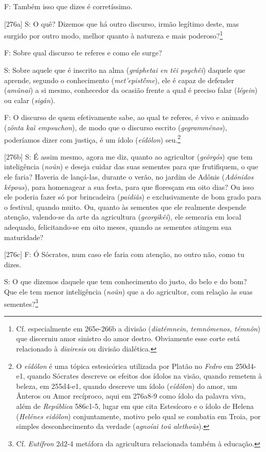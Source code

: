 F: Também isso que dizes é corretíssimo.

{[}276a{]} S: O quê? Dizemos que há outro discurso, irmão legítimo
deste, mas surgido por outro modo, melhor quanto à natureza e mais
poderoso?\footnote{Cf. especialmente em 265e-266b a divisão
  (\emph{diatémnein, temnómenos, témnôn}) que discerniu amor sinistro do
  amor destro. Obviamente esse corte está relacionado à \emph{diairesis}
  ou divisão dialética.}

F: Sobre qual discurso te referes e como ele surge?

S: Sobre aquele que é inscrito na alma (\emph{gráphetai en têi psychêi})
daquele que aprende, segundo o conhecimento (\emph{met'epistḗme}), ele é
capaz de defender (\emph{amûnai}) a si mesmo, conhecedor da ocasião
frente a qual é preciso falar (\emph{légein}) ou calar (\emph{sigân}).

F: O discurso de quem efetivamente sabe, ao qual te referes, é vivo e
animado (\emph{zônta kaì empsuchon}), de modo que o discurso escrito
(\emph{gegramménos}), poderíamos dizer com justiça, é um ídolo
(\emph{eídôlon}) seu.\footnote{O \emph{eídôlon} é uma tópica
  estesicórica utilizada por Platão no \emph{Fedro} em 250d4-e1, quando
  Sócrates descreve os efeitos dos ídolos na visão, quando remetem à
  beleza, em 255d4-e1, quando descreve um ídolo (\emph{eídôlon}) do
  amor, um Ânteros ou Amor recíproco, aqui em 276a8-9 como ídolo da
  palavra viva, além de \emph{República} 586c1-5, lugar em que cita
  Estesícoro e o ídolo de Helena (\emph{Helénes eidôlon}) conjuntamente,
  motivo pelo qual se combatia em Troia, por simples desconhecimento da
  verdade (\emph{agnoíai toû alethoûs}).}

{[}276b{]} S: É assim mesmo, agora me diz, quanto ao agricultor
(\emph{geôrgós}) que tem inteligência (\emph{noûn}) e deseja cuidar das
suas sementes para que frutifiquem, o que ele faria? Haveria de
lançá-las, durante o verão, no jardim de Adônis (\emph{Adónidos
kêpous}), para homenagear a sua festa, para que floresçam em oito dias?
Ou isso ele poderia fazer só por brincadeira (\emph{paidiâs}) e
exclusivamente de bom grado para o festival, quando muito. Ou, quanto às
sementes que ele realmente despende atenção, valendo-se da arte da
agricultura (\emph{georgikêi}), ele semearia em local adequado,
felicitando-se em oito meses, quando as sementes atingem sua maturidade?

{[}276c{]} F: Ó Sócrates, num caso ele faria com atenção, no outro não,
como tu dizes.

S: O que dizemos daquele que tem conhecimento do justo, do belo e do
bom? Que ele tem menor inteligência (\emph{noûn}) que a do agricultor,
com relação às suas sementes?\footnote{Cf. \emph{Eutífron} 2d2-4
  metáfora da agricultura relacionada também à educação.}


